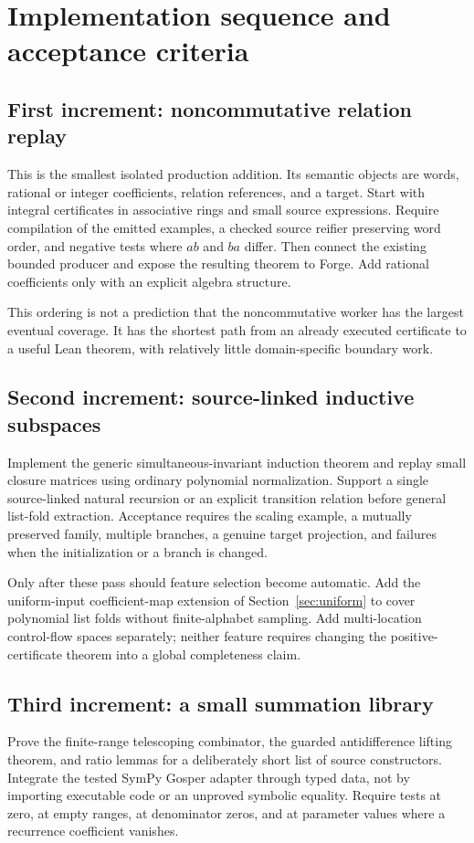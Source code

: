 \documentclass[11pt,letterpaper]{article}
\theoremstyle{definition}\newtheorem{definition}[theorem]{Definition}
\theoremstyle{remark}\newtheorem{remark}[theorem]{Remark}
\begin{document}
\section{Implementation sequence and acceptance criteria}
\label{sec:roadmap}

\subsection{First increment: noncommutative relation replay}
This is the smallest isolated production addition. Its semantic objects are
words, rational or integer coefficients, relation references, and a target.
Start with integral certificates in associative rings and small source
expressions. Require compilation of the emitted examples, a checked source
reifier preserving word order, and negative tests where $ab$ and $ba$ differ.
Then connect the existing bounded producer and expose the resulting theorem to
Forge. Add rational coefficients only with an explicit algebra structure.

This ordering is not a prediction that the noncommutative worker has the
largest eventual coverage. It has the shortest path from an already executed
certificate to a useful Lean theorem, with relatively little domain-specific
boundary work.

\subsection{Second increment: source-linked inductive subspaces}
Implement the generic simultaneous-invariant induction theorem and replay
small closure matrices using ordinary polynomial normalization. Support a
single source-linked natural recursion or an explicit transition relation
before general list-fold extraction. Acceptance requires the scaling example,
a mutually preserved family, multiple branches, a genuine target projection,
and failures when the initialization or a branch is changed.

Only after these pass should feature selection become automatic. Add the
uniform-input coefficient-map extension of Section~\ref{sec:uniform} to cover
polynomial list folds without finite-alphabet sampling. Add multi-location
control-flow spaces separately; neither feature requires changing the
positive-certificate theorem into a global completeness claim.

\subsection{Third increment: a small summation library}
Prove the finite-range telescoping combinator, the guarded antidifference
lifting theorem, and ratio lemmas for a deliberately short list of source
constructors. Integrate the tested SymPy Gosper adapter through typed data,
not by importing executable code or an unproved symbolic equality.
Require tests at zero, at empty ranges, at denominator zeros, and at parameter
values where a recurrence coefficient vanishes.
\end{document}
